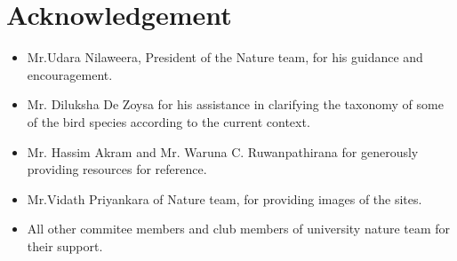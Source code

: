 \chapter{Acknowledgement}
\label{cp:Acknowledgement}
\begin{itemize}
    \item Mr.Udara Nilaweera, President of the Nature team, for his guidance and encouragement.\\
    \item Mr. Diluksha De Zoysa for his assistance in clarifying the taxonomy of some of the bird species according to the current context.\\
    \item Mr. Hassim Akram and Mr. Waruna C. Ruwanpathirana for generously providing resources for reference.\\
    \item Mr.Vidath Priyankara of Nature team, for providing images of the sites.
    \\
    \item All other commitee members and club members of university nature team for their support.
\end{itemize}